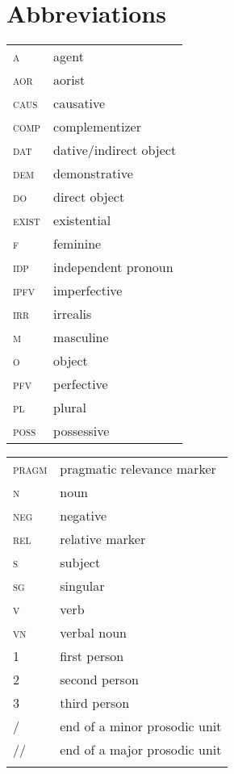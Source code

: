 \documentclass[output=paper]{langsci/langscibook}
\begin{document}
\section*{Abbreviations}
\begin{tabularx}{.45\textwidth}{lQ}
{\textsc{a}}		& agent \\
{\textsc{aor}}		& aorist \\
{\textsc{caus}}	& causative \\
{\textsc{comp}}	& complementizer \\
{\textsc{dat}}		& dative/indirect object \\
{\textsc{dem}}		& demonstrative \\
{\textsc{do}}		& direct object \\
{\textsc{exist}}		& existential \\
{\textsc{f}}		& feminine \\
{\textsc{idp}}		& independent pronoun\\
{\textsc{ipfv}}		& imperfective \\
{\textsc{irr}}		& irrealis \\
{\textsc{m}}		& masculine \\
{\textsc{o}}		& object \\
{\textsc{pfv}}		& perfective \\
{\textsc{pl}}		& plural \\
{\textsc{poss}}	& possessive \\
\end{tabularx}
\begin{tabularx}{.45\textwidth}{lQ}
{\textsc{pragm}}	& pragmatic relevance marker \\
{\textsc{n}}		& noun \\
{\textsc{neg}}		& negative \\
{\textsc{rel}}		& relative marker \\
{\textsc{s}}		& subject \\
{\textsc{sg}}		& singular \\
{\textsc{v}}		& verb \\
{\textsc{vn}}		& verbal noun \\
1		& first person \\
2 		& second person \\
3		& third person \\
/		& end of a minor prosodic unit \\
//		& end of a major prosodic unit \\
\\
\end{tabularx}



{\sloppy\printbibliography[heading=subbibliography,notkeyword=this]}
\end{document}
